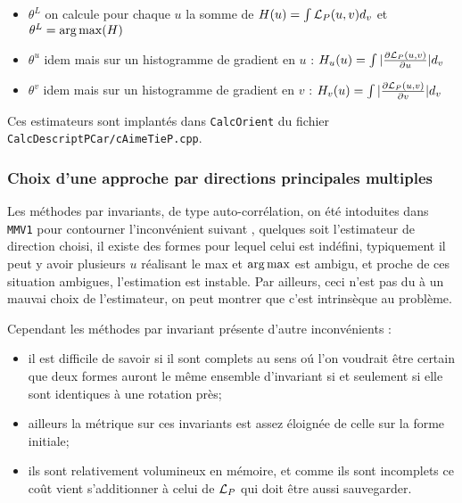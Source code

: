 \begin{itemize}
   \item $\theta^L$  on calcule pour chaque $u$ la somme de $H(u) = \int {\mathcal L_P}(u,v) d_v$
         et  $\theta^L = \operatorname*{arg\,max} (H)$

   \item $\theta^u$  idem mais sur un histogramme de gradient en $u$ :  $H_u(u) = \int |\frac{ \partial {\mathcal L_P}(u,v)}{\partial u}| d_v$

   \item $\theta^v$  idem mais sur un histogramme de gradient en $v$ :  $H_v(u) = \int |\frac{ \partial {\mathcal L_P}(u,v)}{\partial v}| d_v$
\end{itemize}


Ces estimateurs sont implant\'es dans {\tt CalcOrient} du fichier {\tt CalcDescriptPCar/cAimeTieP.cpp}.


\subsubsection{Choix d'une approche par directions principales multiples}

Les m\'ethodes par invariants, de type auto-corr\'elation, on \'et\'e intoduites dans {\tt MMV1}
pour contourner l'inconv\'enient suivant , quelques soit l'estimateur de direction choisi, il existe des formes
pour lequel celui est ind\'efini, typiquement il peut y avoir plusieurs $u$ r\'ealisant le max et $\operatorname*{arg\,max}$
est ambigu, et proche de ces situation ambigues, l'estimation est instable.
Par ailleurs, ceci n'est pas du \`a un mauvai choix de l'estimateur, on peut montrer que c'est intrins\`eque
au probl\`eme.


Cependant les m\'ethodes par invariant pr\'esente d'autre inconv\'enients :

\begin{itemize}
   \item il est difficile de savoir si il sont complets au sens o\'u l'on voudrait \^etre certain
         que deux formes auront le  m\^eme ensemble d'invariant si et seulement si elle sont identiques
         \`a une rotation pr\`es;

   \item ailleurs la m\'etrique sur ces invariants est assez \'eloign\'ee de celle sur la forme initiale;

   \item  ils sont relativement  volumineux en m\'emoire, et comme ils sont incomplets ce co\^ut vient
          s'additionner  \`a celui de ${\mathcal L_P}$ qui  doit \^etre aussi sauvegarder.
\end{itemize}


